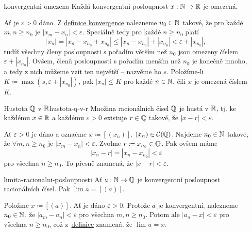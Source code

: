 \begin{lemma}{}{konvergentni-omezena}
 Každá konvergentní posloupnost $x:\mathbb{N} \to \mathbb{R}$ je omezená.
\end{lemma}
\begin{lemproof}
 Ať je $\varepsilon>0$ dáno. Z \hyperref[def:konvergentni-posloupnost]{definice
 konvergence} nalezneme $n_0 \in \mathbb{N}$ takové, že pro každé $m,n \geq n_0$ je
 $|x_m - x_n| < \varepsilon$. Speciálně tedy pro každé $n \geq n_0$ platí
 \[
  |x_n| = |x_n - x_{n_0} + x_{n_0}| \leq |x_n - x_{n_0}| + |x_{n_0}| <
  \varepsilon + |x_{n_0}|,
 \]
 tudíž všechny členy posloupnosti s pořadím větším než $n_0$ jsou omezeny číslem
 $\varepsilon + |x_{n_0}|$. Ovšem, členů posloupnosti s pořadím menším než $n_0$
 je konečně mnoho, a tedy z nich můžeme vzít ten největší -- nazvěme ho $s$.
 Položíme-li $K \coloneqq \max(s,\varepsilon + |x_{n_0}|)$, pak $|x_n| \leq K$
 pro každé $n \in \mathbb{N}$, čili $x$ je omezená číslem $K$.
\end{lemproof}

\begin{proposition}{Hustota $\mathbb{Q}$ v $\mathbb{R}$}{hustota-q-v-r}
 Množina racionálních čísel $\mathbb{Q}$ je hustá v $\mathbb{R}$, tj. ke každému $x \in \mathbb{R}$ a
 každému $\varepsilon>0$ existuje $r \in \mathbb{Q}$ takové, že $|x-r|<\varepsilon$.
\end{proposition}
\begin{propproof}
 Ať $\varepsilon>0$ je dáno a označme $x \coloneqq [(x_n)]$, $(x_n) \in
 \mathcal{C}(\mathbb{Q})$. Najdeme $n_0 \in \mathbb{N}$ takové, že $ \forall m,n \geq n_0$ je
 $|x_m - x_n|<\varepsilon$. Zvolme $r \coloneqq x_{n_0} \in \mathbb{Q}$. Pak ovšem máme
 \[
  |x_n - r| = |x_n - x_{n_0}| < \varepsilon
 \]
 pro všechna $n \geq n_0$. To přesně znamená, že $|x - r| < \varepsilon$.
\end{propproof}

\begin{lemma}{}{limita-racionalni-posloupnosti}
 Ať $a:\mathbb{N} \to \mathbb{Q}$ je konvergentní posloupnost racionálních čísel. Pak $\lim a =
 [(a)]$.
\end{lemma}
\begin{lemproof}
 Položme $x \coloneqq [(a)]$. Ať je dáno $\varepsilon>0$. Protože $a$ je
 konvergentní, nalezneme $n_0 \in \mathbb{N}$, že $|a_m - a_n|<\varepsilon$ pro všechna
 $m,n \geq n_0$. Potom ale $|a_n - x|<\varepsilon$ pro všechna $n \geq n_0$, což
 z~\hyperref[def:limita-posloupnosti]{definice} znamená, že $\lim_{} a = x$.
\end{lemproof}

